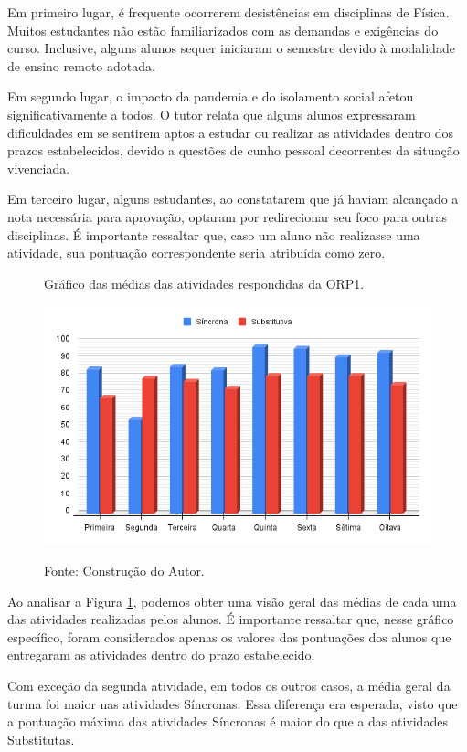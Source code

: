 Em primeiro lugar, é frequente ocorrerem desistências em disciplinas de Física. Muitos estudantes não estão familiarizados com as demandas e exigências do curso. Inclusive, alguns alunos sequer iniciaram o semestre devido à modalidade de ensino remoto adotada.

Em segundo lugar, o impacto da pandemia e do isolamento social afetou significativamente a todos. O tutor relata que alguns alunos expressaram dificuldades em se sentirem aptos a estudar ou realizar as atividades dentro dos prazos estabelecidos, devido a questões de cunho pessoal decorrentes da situação vivenciada.

Em terceiro lugar, alguns estudantes, ao constatarem que já haviam alcançado a nota necessária para aprovação, optaram por redirecionar seu foco para outras disciplinas. É importante ressaltar que, caso um aluno não realizasse uma atividade, sua pontuação correspondente seria atribuída como zero.

\begin{figure}[ht]
\begin{center}
\caption{Gráfico das médias das atividades respondidas da ORP1.}
\includegraphics[width=1\textwidth]{fig/mediasORP1.png}
\label{fig:medORP1}
\caption*{Fonte: Construção do Autor.}
\end{center}
\end{figure}

Ao analisar a Figura \ref{fig:medORP1}, podemos obter uma visão geral das médias de cada uma das atividades realizadas pelos alunos. É importante ressaltar que, nesse gráfico específico, foram considerados apenas os valores das pontuações dos alunos que entregaram as atividades dentro do prazo estabelecido.

Com exceção da segunda atividade, em todos os outros casos, a média geral da turma foi maior nas atividades Síncronas. Essa diferença era esperada, visto que a pontuação máxima das atividades Síncronas é maior do que a das atividades Substitutas.

